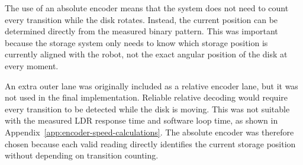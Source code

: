 The use of an absolute encoder means that the system does not need to count every transition while the disk rotates. Instead, the current position can be determined directly from the measured binary pattern. This was important because the storage system only needs to know which storage position is currently aligned with the robot, not the exact angular position of the disk at every moment.


An extra outer lane was originally included as a relative encoder lane, but it was not used in the final implementation. Reliable relative decoding would require every transition to be detected while the disk is moving. This was not suitable with the measured LDR response time and software loop time, as shown in Appendix~\ref{app:encoder-speed-calculations}. The absolute encoder was therefore chosen because each valid reading directly identifies the current storage position without depending on transition counting.




